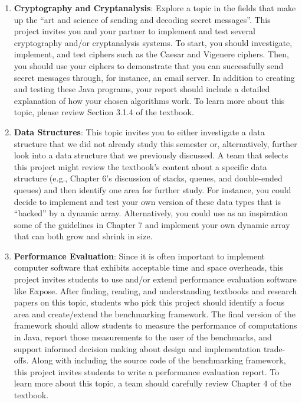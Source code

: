 \begin{enumerate}

  \item {\bf Cryptography and Cryptanalysis}: Explore a topic in the fields that make up the ``art and science of
    sending and decoding secret messages''. This project invites you and your partner to implement and test several
    cryptography and/or cryptanalysis systems.  To start, you should investigate, implement, and test ciphers such as
    the Caesar and Vigenere ciphers. Then, you should use your ciphers to demonstrate that you can successfully send
    secret messages through, for instance, an email server. In addition to creating and testing these Java programs,
    your report should include a detailed explanation of how your chosen algorithms work. To learn more about this
    topic, please review Section 3.1.4 of the textbook.

  \item {\bf Data Structures}: This topic invites you to either investigate a data structure that we did not already
    study this semester or, alternatively, further look into a data structure that we previously discussed. A team that
    selects this project might review the textbook's content about a specific data structure (e.g., Chapter 6's
    discussion of stacks, queues, and double-ended queues) and then identify one area for further study. For instance,
    you could decide to implement and test your own version of these data types that is ``backed'' by a dynamic array.
    Alternatively, you could use as an inspiration some of the guidelines in Chapter 7 and implement your own dynamic
    array that can both grow and shrink in size.

  \item {\bf Performance Evaluation}: Since it is often important to implement computer software that exhibits
    acceptable time and space overheads, this project invites students to use and/or extend performance evaluation
    software like Expose.  After finding, reading, and understanding textbooks and research papers on this topic,
    students who pick this project should identify a focus area and create/extend the benchmarking framework.  The final
    version of the framework should allow students to measure the performance of computations in Java, report those
    measurements to the user of the benchmarks, and support informed decision making about design and implementation
    trade-offs. Along with including the source code of the benchmarking framework, this project invites students to
    write a performance evaluation report. To learn more about this topic, a team should carefully review Chapter 4 of
    the textbook.


\end{enumerate}
